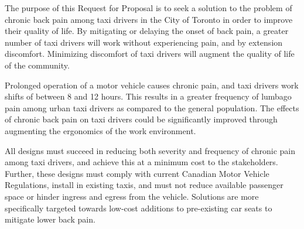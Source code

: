 The purpose of this Request for Proposal is to seek a solution to the
problem of chronic back pain among taxi drivers in the City of Toronto in
order to improve their quality of life. By mitigating or delaying the
onset of back pain, a greater number of taxi drivers will work without 
experiencing pain, and by extension discomfort. Minimizing discomfort of taxi drivers
will augment the quality of life of the community. 

Prolonged operation of a motor vehicle causes chronic pain, and taxi
drivers work shifts of between 8 and 12 hours. This results in a
greater frequency of lumbago pain among urban
taxi drivers as compared to the general population. The effects of chronic back pain
on taxi drivers could be significantly improved through augmenting 
the ergonomics of the work environment.

All designs must succeed in reducing both severity and frequency of
chronic pain among taxi drivers, and achieve this at a minimum cost to
the stakeholders. Further, these designs must comply with current
Canadian Motor Vehicle Regulations, install in existing taxis, and
must not reduce available passenger space or hinder ingress and
egress from the vehicle. Solutions are more specifically targeted
towards low-cost additions to pre-existing car seats to mitigate lower
back pain.
